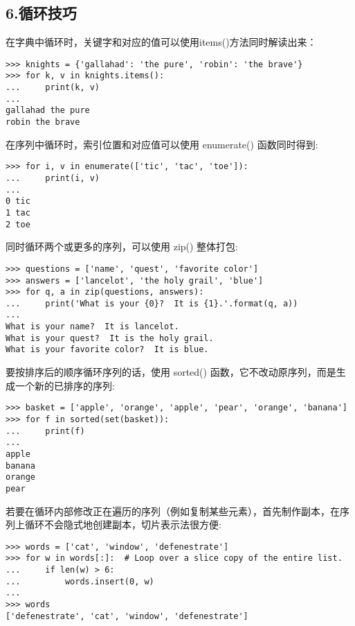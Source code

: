 \documentclass{article}
\begin{document}
\begin{CJK}{UTF8}{gbsn}
\section*{6.循环技巧}
在字典中循环时，关键字和对应的值可以使用items()方法同时解读出来：
\begin{verbatim}
>>> knights = {'gallahad': 'the pure', 'robin': 'the brave'}
>>> for k, v in knights.items():
...     print(k, v)
...
gallahad the pure
robin the brave
\end{verbatim}
在序列中循环时，索引位置和对应值可以使用 enumerate() 函数同时得到:
\begin{verbatim}
>>> for i, v in enumerate(['tic', 'tac', 'toe']):
...     print(i, v)
...
0 tic
1 tac
2 toe
\end{verbatim}
同时循环两个或更多的序列，可以使用 zip() 整体打包:
\begin{verbatim}
>>> questions = ['name', 'quest', 'favorite color']
>>> answers = ['lancelot', 'the holy grail', 'blue']
>>> for q, a in zip(questions, answers):
...     print('What is your {0}?  It is {1}.'.format(q, a))
...
What is your name?  It is lancelot.
What is your quest?  It is the holy grail.
What is your favorite color?  It is blue.
\end{verbatim}
要按排序后的顺序循环序列的话，使用 sorted() 函数，它不改动原序列，而是生成一个新的已排序的序列:
\begin{verbatim}
>>> basket = ['apple', 'orange', 'apple', 'pear', 'orange', 'banana']
>>> for f in sorted(set(basket)):
...     print(f)
...
apple
banana
orange
pear
\end{verbatim}
若要在循环内部修改正在遍历的序列（例如复制某些元素），首先制作副本，在序列上循环不会隐式地创建副本，切片表示法很方便:
\begin{verbatim}
>>> words = ['cat', 'window', 'defenestrate']
>>> for w in words[:]:  # Loop over a slice copy of the entire list.
...     if len(w) > 6:
...         words.insert(0, w)
...
>>> words
['defenestrate', 'cat', 'window', 'defenestrate']
\end{verbatim}

\end{CJK}
\end{document}
